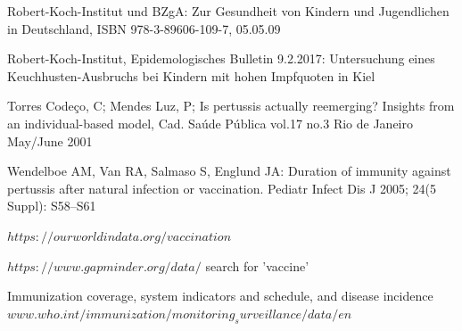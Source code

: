 \documentclass[11pt]{article}
\begin{document}
Robert-Koch-Institut und BZgA: Zur Gesundheit von Kindern und Jugendlichen in Deutschland, ISBN 978-3-89606-109-7, 05.05.09
\vspace{14px}

Robert-Koch-Institut, Epidemologisches Bulletin 9.2.2017: Untersuchung eines Keuchhusten-Ausbruchs bei Kindern mit hohen Impfquoten in Kiel
\vspace{14px}

Torres Codeço, C; Mendes Luz, P; Is pertussis actually reemerging? Insights from an individual-based model, Cad. Saúde Pública vol.17 no.3 Rio de Janeiro May/June 2001
\vspace{14px}

Wendelboe AM, Van RA, Salmaso S, Englund JA: Duration of immunity against pertussis after natural infection or vaccination. Pediatr Infect Dis J 2005; 24(5 Suppl): S58–S61
\vspace{14px}

$https://ourworldindata.org/vaccination$ 
\vspace{14px}

$https://www.gapminder.org/data/$ search for 'vaccine'
\vspace{14px}

Immunization coverage, system indicators and schedule, and disease incidence $www.who.int/immunization/monitoring_surveillance/data/en$


\newpage
\end{document}
